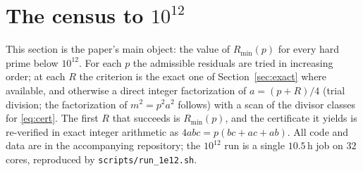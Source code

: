 \documentclass[11pt]{article}
\theoremstyle{plain}
\theoremstyle{remark}
\theoremstyle{plain}
\numberwithin{equation}{section}
\begin{document}
\section{The census to \texorpdfstring{$10^{12}$}{10\textasciicircum 12}}\label{sec:comp}

This section is the paper's main object: the value of $R_{\min}(p)$
for every hard prime below $10^{12}$. For each $p$ the admissible
residuals are tried in increasing order; at each $R$ the criterion is
the exact one of Section~\ref{sec:exact} where available, and
otherwise a direct integer factorization of $a = (p+R)/4$ (trial
division; the factorization of $m^2 = p^2a^2$ follows) with a scan of
the divisor classes for \eqref{eq:cert}. The first $R$ that succeeds
is $R_{\min}(p)$, and the certificate it yields is re-verified in
exact integer arithmetic as $4abc = p(bc+ac+ab)$. All code and data
are in the accompanying repository; the $10^{12}$ run is a single
$10.5$\,h job on $32$ cores, reproduced by
\texttt{scripts/run\_1e12.sh}.
\end{document}

